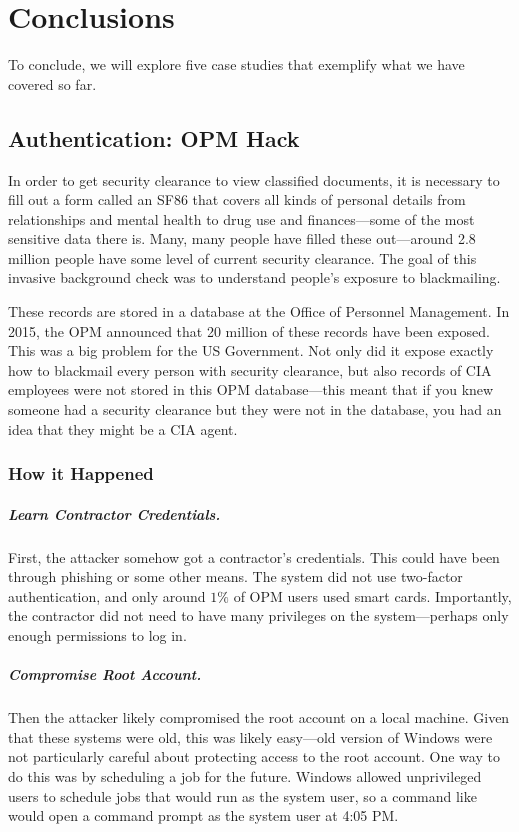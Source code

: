 \chapter{Conclusions}

To conclude, we will explore five case studies that exemplify what we have covered so far.

\section{Authentication: OPM Hack}

In order to get security clearance to view classified documents, it is necessary to fill out a form called an SF86 that covers all kinds of personal details from relationships and mental health to drug use and finances---some of the most sensitive data there is. Many, many people have filled these out---around 2.8 million people have some level of current security clearance. The goal of this invasive background check was to understand people's exposure to blackmailing.

These records are stored in a database at the Office of Personnel Management. In 2015, the OPM announced that 20 million of these records have been exposed. This was a big problem for the US Government. Not only did it expose exactly how to blackmail every person with security clearance, but also records of CIA employees were not stored in this OPM database---this meant that if you knew someone had a security clearance but they were not in the database, you had an idea that they might be a CIA agent.

\subsection{How it Happened}

\paragraph{Learn Contractor Credentials.} First, the attacker somehow got a contractor's credentials. This could have been through phishing or some other means. The system did not use two-factor authentication, and only around $1\%$ of OPM users used smart cards. Importantly, the contractor did not need to have many privileges on the system---perhaps only enough permissions to log in.

\paragraph{Compromise Root Account.} Then the attacker likely compromised the root account on a local machine. Given that these systems were old, this was likely easy---old version of Windows were not particularly careful about protecting access to the root account. One way to do this was by scheduling a job for the future. Windows allowed unprivileged users to schedule jobs that would run as the system user, so a command like  would open a command prompt as the system user at 4:05 PM.

